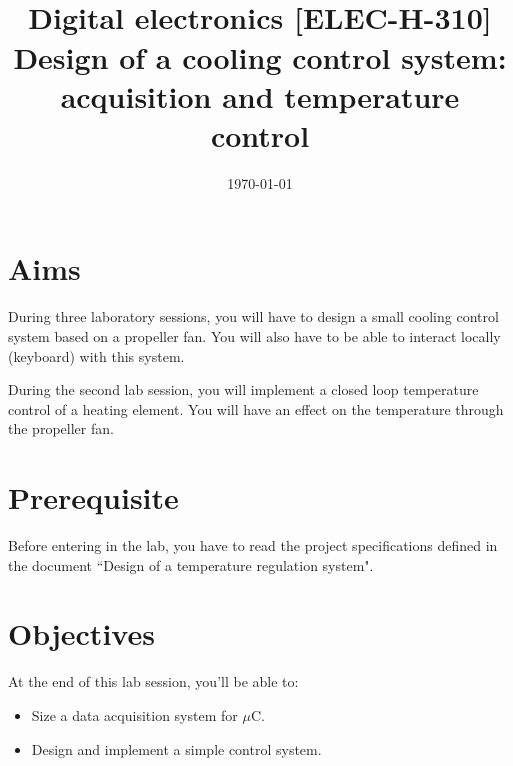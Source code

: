 \documentclass[11pt,a4paper]{article}
\date{\vspace{-1.7cm}\mydate\today}
\title{\vspace{-2cm}\labonumber \\ Digital electronics [ELEC-H-310]\\Design of a cooling control system: \\ acquisition and temperature control\ifthenelse{\boolean{corrige}}{~\\Corrigé}{}}
\theoremstyle{definition}%
\begin{document}
\pagestyle{empty}
\maketitle





\section*{Aims}
During three laboratory sessions, you will have to design a small cooling control system based on a propeller fan.
You will also have to be able to interact locally (keyboard) with this system.

During the second lab session, you will implement a closed loop temperature control of a heating element.
You will have an effect on the temperature through the propeller fan.

\section*{Prerequisite}
Before entering in the lab, you have to read the project specifications defined in the document ``Design of a temperature regulation system".


\section*{Objectives}
At the end of this lab session, you'll be able to:
\begin{itemize}
	\item Size a data acquisition system for $\mu$C.
	\item Design and implement a simple control system.
\end{itemize}


\newpage




\end{document}
